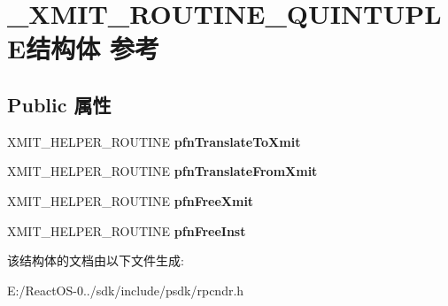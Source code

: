 \hypertarget{struct___x_m_i_t___r_o_u_t_i_n_e___q_u_i_n_t_u_p_l_e}{}\section{\+\_\+\+X\+M\+I\+T\+\_\+\+R\+O\+U\+T\+I\+N\+E\+\_\+\+Q\+U\+I\+N\+T\+U\+P\+L\+E结构体 参考}
\label{struct___x_m_i_t___r_o_u_t_i_n_e___q_u_i_n_t_u_p_l_e}
\subsection*{Public 属性}
\begin{DoxyCompactItemize}
\item 
\mbox{\label{struct___x_m_i_t___r_o_u_t_i_n_e___q_u_i_n_t_u_p_l_e_a602d2eeb39e9c1f6c2be3c0521f9b972}} 
X\+M\+I\+T\+\_\+\+H\+E\+L\+P\+E\+R\+\_\+\+R\+O\+U\+T\+I\+NE {\bfseries pfn\+Translate\+To\+Xmit}
\item 
\mbox{\label{struct___x_m_i_t___r_o_u_t_i_n_e___q_u_i_n_t_u_p_l_e_a29e050d7240e19bb12044f06c1d8aad0}} 
X\+M\+I\+T\+\_\+\+H\+E\+L\+P\+E\+R\+\_\+\+R\+O\+U\+T\+I\+NE {\bfseries pfn\+Translate\+From\+Xmit}
\item 
\mbox{\label{struct___x_m_i_t___r_o_u_t_i_n_e___q_u_i_n_t_u_p_l_e_ab4a0cfadab8f08a2b7f81af757909fac}} 
X\+M\+I\+T\+\_\+\+H\+E\+L\+P\+E\+R\+\_\+\+R\+O\+U\+T\+I\+NE {\bfseries pfn\+Free\+Xmit}
\item 
\mbox{\label{struct___x_m_i_t___r_o_u_t_i_n_e___q_u_i_n_t_u_p_l_e_a7b73e0662378f3d91101b3439bf04bb6}} 
X\+M\+I\+T\+\_\+\+H\+E\+L\+P\+E\+R\+\_\+\+R\+O\+U\+T\+I\+NE {\bfseries pfn\+Free\+Inst}
\end{DoxyCompactItemize}


该结构体的文档由以下文件生成\+:\begin{DoxyCompactItemize}
\item 
E\+:/\+React\+O\+S-\/0../sdk/include/psdk/rpcndr.\+h\end{DoxyCompactItemize}
